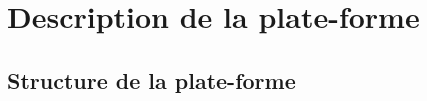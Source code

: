 \section{Description de la plate-forme}
\label{sec:desc_plateforme}

\subsection{Structure de la plate-forme}






